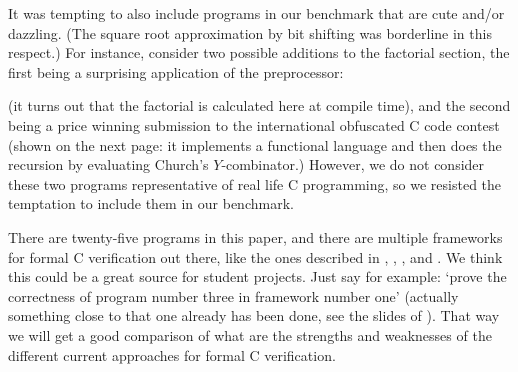 \documentclass{article}
\begin{document}
It was tempting to also include programs in our benchmark that are cute and/or dazzling.
(The square root approximation by bit shifting was borderline in this respect.)
For instance, consider two possible additions to the factorial
section,
the first being a surprising application of the preprocessor:


(it turns out that the factorial is calculated here at compile time),
and the second being a price winning submission to the international
obfuscated C code contest
(shown on the next page: it implements a functional language and then does the recursion by
evaluating Church's $Y$-combinator.)
However, we do not consider these two programs representative of
real life C programming, so we resisted the temptation to include them in our benchmark.

There are twenty-five programs in this paper, and there are multiple
frameworks for formal C verification out there, like the ones described
in \cite{app:11}, \cite{dah:mos:san:tob:sch:09}, \cite{gre:and:klei:12}, \cite{jac:sma:phi:vog:pen:pie:11} and \cite{mar:07}.
We think this could be a great source for student projects.
Just say for example: `prove the correctness of program number three in framework
number one' (actually something close to that one already has been done, see the slides of \cite{wie:16:1}).
That way we will get a good comparison of what are the strengths and
weaknesses of the different current approaches for formal C verification.



\end{document}
